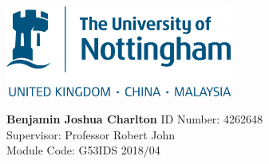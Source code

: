 \documentclass[a4paper]{article}
\begin{document}

\begin{center}
	\includegraphics[height=3cm]{UoNLogo.png}

	\vfill
	\Huge{\textbf{Benjamin Joshua Charlton}}
	\vfill
	\LARGE{	ID Number: 4262648 \\
			Supervisor: Professor Robert John \\
			Module Code: G53IDS
			\vfill
			2018/04
			\vfill}
	\afterpage{\null\newpage}
\end{center}
\end{document}
